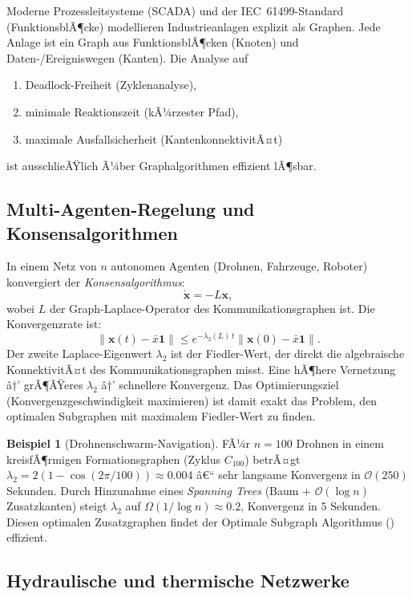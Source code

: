 ﻿\documentclass[12pt,a4paper,twoside]{article}
\theoremstyle{definition}
\newtheorem{beispiel}{Beispiel}[section]
\theoremstyle{plain}
\theoremstyle{remark}
\begin{document}
Moderne Prozessleitsysteme (SCADA) und der IEC~61499-Standard
(FunktionsblÃ¶cke) modellieren Industrieanlagen explizit als
Graphen.  Jede Anlage ist ein Graph aus FunktionsblÃ¶cken (Knoten)
und Daten-/Ereigniswegen (Kanten).  Die Analyse auf
\begin{enumerate}
  \item Deadlock-Freiheit (Zyklenanalyse),
  \item minimale Reaktionszeit (kÃ¼rzester Pfad),
  \item maximale Ausfallsicherheit (KantenkonnektivitÃ¤t)
\end{enumerate}
ist ausschlieÃŸlich Ã¼ber Graphalgorithmen effizient lÃ¶sbar.

\subsection{Multi-Agenten-Regelung und Konsensalgorithmen}

In einem Netz von $n$ autonomen Agenten (Drohnen, Fahrzeuge,
Roboter) konvergiert der \emph{Konsensalgorithmus}:
\[
  \dot{\mathbf{x}} = -L\mathbf{x},
\]
wobei $L$ der Graph-Laplace-Operator des Kommunikationsgraphen
ist.  Die Konvergenzrate ist:
\[
  \|\mathbf{x}(t) - \bar{x}\mathbf{1}\| \leq
  e^{-\lambda_2(L)\, t} \|\mathbf{x}(0) - \bar{x}\mathbf{1}\|.
\]
Der zweite Laplace-Eigenwert $\lambda_2$ ist der Fiedler-Wert,
der direkt die algebraische KonnektivitÃ¤t des Kommunikationsgraphen
misst. Eine hÃ¶here Vernetzung â†’ grÃ¶ÃŸeres $\lambda_2$ â†’
schnellere Konvergenz. Das Optimierungsziel (Konvergenz\-geschwindigkeit
maximieren) ist damit exakt das Problem, den optimalen
Subgraphen mit maximalem Fiedler-Wert zu finden.

\begin{beispiel}[Drohnenschwarm-Navigation]
FÃ¼r $n=100$ Drohnen in einem kreisfÃ¶rmigen Formationsgraphen
(Zyklus $C_{100}$) betrÃ¤gt $\lambda_2 = 2(1-\cos(2\pi/100))
\approx 0.004$ â€“ sehr langsame Konvergenz in $\mathcal{O}(250)$
Sekunden.  Durch Hinzunahme eines \emph{Spanning Trees} (Baum +
$\mathcal{O}(\log n)$ Zusatzkanten) steigt $\lambda_2$ auf
$\Omega(1/\log n) \approx 0.2$, Konvergenz in $5$ Sekunden.
Diesen optimalen Zusatzgraphen findet der Optimale
Subgraph Algorithmus () effizient.
\end{beispiel}

\subsection{Hydraulische und thermische Netzwerke}
\end{document}
